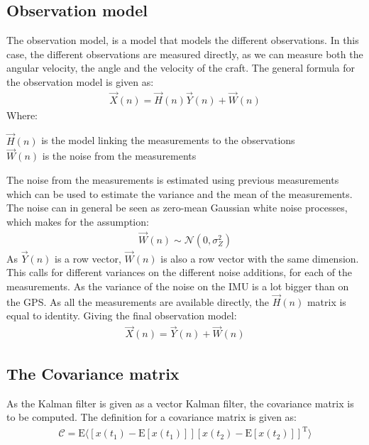 \subsection{Observation model}
The observation model, is a model that models the different observations. In this case, the different observations are measured directly, as we can measure both the angular velocity, the angle and the velocity of the craft. The general formula for the observation model is given as:
\begin{align}
\vec{X}(n) = \vec{H}(n)\vec{Y}(n) + \vec{W}(n)
\end{align}
\noindent Where:
\begin{ffk}
$\vec{H}(n)$ is the model linking the measurements to the observations\\
$\vec{W}(n)$ is the noise from the measurements
\end{ffk}
The noise from the measurements is estimated using previous measurements which can be used to estimate the variance and the mean of the measurements. The noise can in general be seen as zero-mean Gaussian white noise processes, which makes for the assumption:
\begin{align}
\vec{W}(n) \sim \mathcal{N}(0,\sigma_Z^2)
\end{align}
As $\vec{Y}(n)$ is a row vector, $\vec{W}(n)$ is also a row vector with the same dimension. This calls for different variances on the different noise additions, for each of the measurements. As the variance of the noise on the \ac{IMU} is a lot bigger than on the \ac{GPS}. As all the measurements are available directly, the $\vec{H}(n)$ matrix is equal to identity. Giving the final observation model:
\begin{align}
\vec{X}(n) = \vec{Y}(n) + \vec{W}(n)
\end{align}


\subsection{The Covariance matrix}
As the Kalman filter is given as a vector Kalman filter, the covariance matrix is to be computed. The definition for a covariance matrix is given as:
\begin{align}
\mathcal{C} = \text{E}\langle[x(t_1) - \text{E}[x(t_1)]][x(t_2) - \text{E}[x(t_2)]]^\text{T}\rangle
\end{align}
